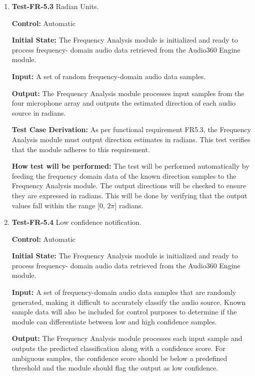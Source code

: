 \documentclass[12pt, titlepage]{article}
\begin{document}
\begin{enumerate}
\[
\text{MAE} = \frac{1}{N} \sum_{i=1}^{N} | \text{Estimated Direction}_i - 
\text{Known Direction}_i |
\]
where \(N\) is the total number of samples.

\item{\textbf{Test-FR-5.3} Radian Units.\\}

\textbf{Control:} Automatic

\textbf{Initial State:}
The Frequency Analysis module is initialized and ready to process frequency-
domain audio data retrieved from the Audio360 Engine module.

\textbf{Input:}
A set of random frequency-domain audio data samples.

\textbf{Output:}
The Frequency Analysis module processes input samples from the four microphone
array and outputs the estimated direction of each audio source in radians.

\textbf{Test Case Derivation:}
As per functional requirement FR5.3, the Frequency Analysis module must output
direction estimates in radians. This test verifies that the module adheres to
this requirement.

\textbf{How test will be performed:}
The test will be performed automatically by feeding the frequency domain data of
the known direction samples to the Frequency Analysis module. The output
directions will be checked to ensure they are expressed in radians. This will be
done by verifying that the output values fall within the range [0, \(2\pi\)]
radians.

\item{\textbf{Test-FR-5.4} Low confidence notification.\\}

\textbf{Control:} Automatic

\textbf{Initial State:}
The Frequency Analysis module is initialized and ready to process frequency-
domain audio data retrieved from the Audio360 Engine module.

\textbf{Input:}
A set of frequency-domain audio data samples that are randomly generated, making
it difficult to accurately classify the audio source. Known sample data will
also be included for control purposes to determine if the module can
differentiate between low and high confidence samples.

\textbf{Output:}
The Frequency Analysis module processes each input sample and outputs the
predicted classification along with a confidence score. For ambiguous samples,
the confidence score should be below a predefined threshold and the module
should flag the output as low confidence.


\end{enumerate}
\end{document}
